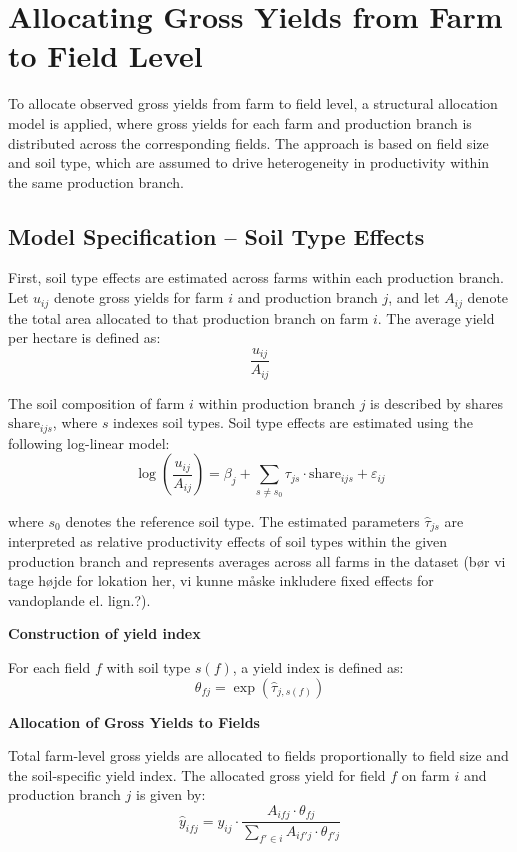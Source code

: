 \documentclass{article}
\begin{document}
\section{Allocating Gross Yields from Farm to Field Level} 


To allocate observed gross yields from farm to field level, a structural allocation model is applied, where gross yields for each farm and production branch is distributed across the corresponding fields. The approach is based on field size and soil type, which are assumed to drive heterogeneity in productivity within the same production branch.

\subsection{Model Specification – Soil Type Effects}

First, soil type effects are estimated across farms within each production branch. Let $u_{ij}$ denote gross yields for farm $i$ and production branch $j$, and let $A_{ij}$ denote the total area allocated to that production branch on farm $i$. The average yield per hectare is defined as:
\[
\frac{u_{ij}}{A_{ij}}
\]

The soil composition of farm $i$ within production branch $j$ is described by shares $\text{share}_{ijs}$, where $s$ indexes soil types. Soil type effects are estimated using the following log-linear model:
\[
\log\left(\frac{u_{ij}}{A_{ij}}\right)
=
\beta_j
+
\sum_{s \neq s_0} \tau_{js} \cdot \text{share}_{ijs}
+
\varepsilon_{ij}
\]

where $s_0$ denotes the reference soil type. The estimated parameters $\hat{\tau}_{js}$ are interpreted as relative productivity effects of soil types within the given production branch and represents averages across all farms in the dataset (bør vi tage højde for lokation her, vi kunne måske inkludere fixed effects for vandoplande el. lign.?).

\vspace{0.5cm}

\textbf{Construction of yield index}

For each field $f$ with soil type $s(f)$, a yield index is defined as:
\[
\theta_{fj} = \exp\left( \hat{\tau}_{j, s(f)} \right)
\]

\vspace{0.5cm}

\textbf{Allocation of Gross Yields to Fields}

Total farm-level gross yields are allocated to fields proportionally to field size and the soil-specific yield index. The allocated gross yield for field $f$ on farm $i$ and production branch $j$ is given by:
\[
\hat{y}_{ifj}
=
y_{ij}
\cdot
\frac{A_{ifj} \cdot \theta_{fj}}
{\sum_{f' \in i} A_{if'j} \cdot \theta_{f'j}}
\]
\end{document}
